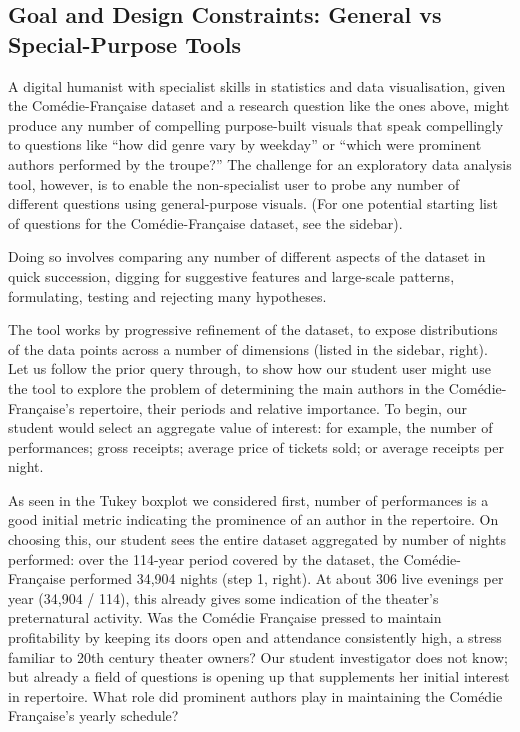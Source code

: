 \documentclass[	DIV=calc,%
							paper=a4,%
							fontsize=11pt,%
							twocolumn]{scrartcl}	 					%
\begin{document}
\subsection*{Goal and Design Constraints: General vs Special-Purpose Tools}

A digital humanist with specialist skills in statistics and data visualisation, given the Comédie-Française dataset and a research question like the ones above, might produce any number of compelling purpose-built visuals that speak compellingly to questions like ``how did genre vary by weekday'' or ``which were prominent authors performed by the troupe?''  The challenge for an exploratory data analysis tool, however, is to enable the non-specialist user to probe any number of different questions using general-purpose visuals.  (For one potential starting list of questions for the Comédie-Française dataset, see the sidebar).

Doing so involves comparing any number of different aspects of the dataset in quick succession, digging for suggestive features and large-scale patterns, formulating, testing and rejecting many hypotheses.

The tool works by progressive refinement of the dataset, to expose distributions of the data points across a number of dimensions (listed in the sidebar, right).  Let us follow the prior query through, to show how our student user might use the tool to explore the problem of determining the main authors in the Comédie-Française’s repertoire, their periods and relative importance.  To begin, our student would select an aggregate value of interest: for example, the number of performances; gross receipts; average price of tickets sold; or average receipts per night.

As seen in the Tukey boxplot we considered first, number of performances is a good initial metric indicating the prominence of an author in the repertoire.  On choosing this, our student sees the entire dataset aggregated by number of nights performed: over the 114-year period covered by the dataset, the Comédie-Française performed 34,904 nights (step 1, right).  At about 306 live evenings per year (34,904 / 114), this already gives some indication of the theater’s preternatural activity.  Was the Comédie Française pressed to maintain profitability by keeping its doors open and attendance consistently high, a stress familiar to 20th century theater owners?  Our student investigator does not know; but already a field of questions is opening up that supplements her initial interest in repertoire.  What role did prominent authors play in maintaining the Comédie Française’s yearly schedule?
\end{document}

